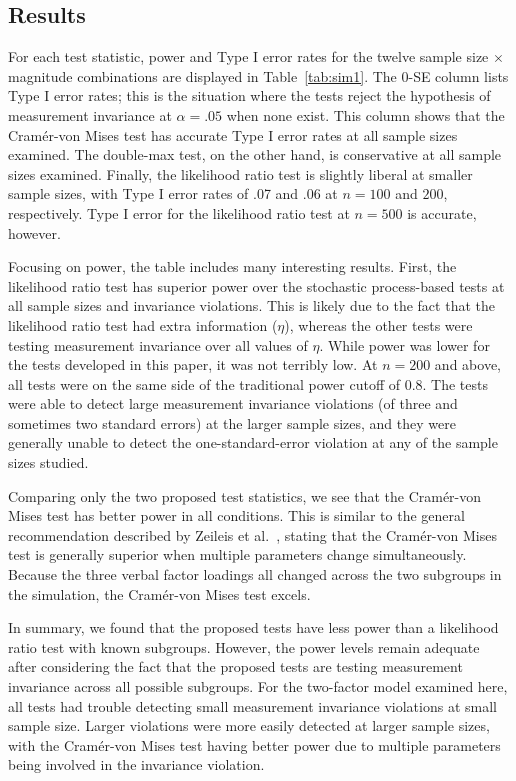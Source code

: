 \documentclass[man]{apa}
\begin{document}
\subsection{Results}
For each test statistic, power and Type I error rates for the twelve
sample size $\times$ magnitude combinations are displayed in
Table~\ref{tab:sim1}.  The 0-SE column lists Type I error rates; this
is the situation where the tests reject the hypothesis of measurement
invariance at $\alpha=.05$ when none exist.  This column 
shows that the Cram\'{e}r-von Mises test has accurate Type I error
rates at all sample sizes examined.
The double-max test, on the other hand, is conservative at
all sample sizes examined.  Finally, the likelihood ratio test is
slightly liberal at smaller sample sizes, with Type I error rates of
.07 and .06 at $n=100$ and $200$, respectively.  Type I error for the
likelihood ratio test at $n=500$ is accurate, however.

Focusing on power, the table includes many interesting results.
First, the likelihood ratio test has superior power over the stochastic
process-based tests at all sample sizes and invariance violations.
This is likely due to the fact that the likelihood ratio test had
extra information ($\eta$), whereas the other tests
were testing measurement invariance over all values
of $\eta$.  While power was lower for the tests developed in this
paper, it was not terribly low.  At $n=200$ and above, all tests were
on the same side of the traditional power cutoff of 0.8.  The tests
were able to detect large measurement invariance violations (of three
and sometimes two standard errors) at the larger sample sizes, and
they were generally unable to detect the one-standard-error violation
at any of the sample sizes studied.

Comparing only the two proposed test statistics, we see that the
Cram\'{e}r-von Mises test has better power in all conditions.  This is
similar to the general recommendation described by Zeileis et al.\
\citeyear{ZeiSha10}, stating that the Cram\'{e}r-von Mises test
is generally superior when multiple parameters change simultaneously.
Because the three verbal factor loadings all changed
across the two subgroups in the simulation, the Cram\'{e}r-von Mises
test excels.

In summary, we found that the proposed tests have less power than a
likelihood ratio test with known subgroups.  However, the power levels
remain adequate after considering the fact that the proposed tests are
testing measurement invariance across all possible subgroups.  For the
two-factor model examined here, all tests had trouble detecting small
measurement invariance violations at small sample size.  Larger
violations were more easily detected at larger sample sizes, with the
Cram\'{e}r-von Mises test having better power due to multiple
parameters being involved in the invariance violation.
\end{document}
